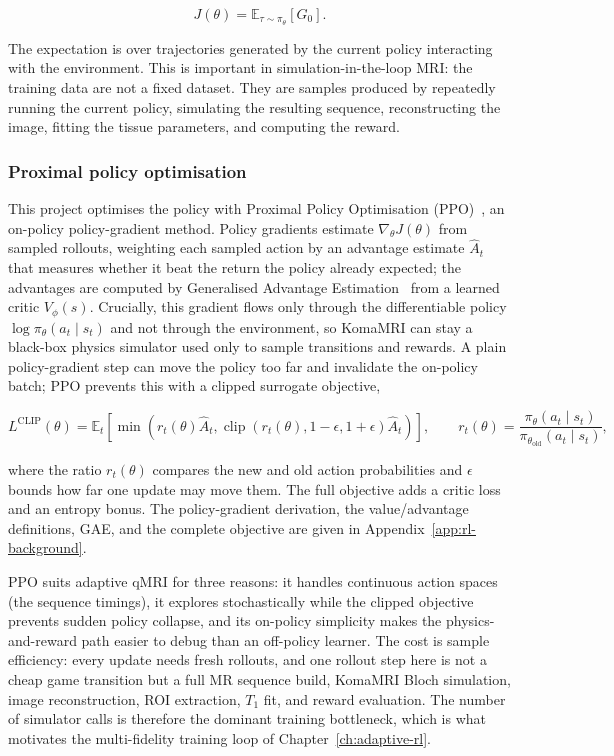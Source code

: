 \begin{equation}
J(\theta) = \mathbb{E}_{\tau \sim \pi_\theta}[G_0].
\end{equation}

The expectation is over trajectories generated by the current policy interacting
with the environment. This is important in simulation-in-the-loop MRI: the
training data are not a fixed dataset. They are samples produced by repeatedly
running the current policy, simulating the resulting sequence, reconstructing
the image, fitting the tissue parameters, and computing the reward.

\subsubsection{Proximal policy optimisation}
This project optimises the policy with Proximal Policy Optimisation
(PPO)~\cite{schulman_ppo_2017}, an on-policy policy-gradient method. Policy
gradients estimate $\nabla_\theta J(\theta)$ from sampled rollouts, weighting
each sampled action by an advantage estimate $\hat{A}_t$ that measures whether
it beat the return the policy already expected; the advantages are computed by
Generalised Advantage Estimation~\cite{schulman_gae_2016} from a learned critic
$V_\phi(s)$. Crucially, this gradient flows only through the differentiable
policy $\log\pi_\theta(a_t\mid s_t)$ and not through the environment, so KomaMRI
can stay a black-box physics simulator used only to sample transitions and
rewards. A plain policy-gradient step can move the policy too far and
invalidate the on-policy batch; PPO prevents this with a clipped surrogate
objective,

\begin{equation}
L^{\mathrm{CLIP}}(\theta)
=
\mathbb{E}_t
\left[
\min
\left(
    r_t(\theta)\hat{A}_t,
    \operatorname{clip}
    \left(r_t(\theta), 1-\epsilon, 1+\epsilon\right)
    \hat{A}_t
\right)
\right],
\qquad
r_t(\theta) =
\frac{\pi_\theta(a_t\mid s_t)}
     {\pi_{\theta_{\mathrm{old}}}(a_t\mid s_t)},
\end{equation}

where the ratio $r_t(\theta)$ compares the new and old action probabilities and
$\epsilon$ bounds how far one update may move them. The full objective adds a
critic loss and an entropy bonus. The policy-gradient derivation, the
value/advantage definitions, GAE, and the complete objective are given in
Appendix~\ref{app:rl-background}.

PPO suits adaptive qMRI for three reasons: it handles continuous action spaces
(the sequence timings), it explores stochastically while the clipped objective
prevents sudden policy collapse, and its on-policy simplicity makes the
physics-and-reward path easier to debug than an off-policy learner. The cost is
sample efficiency: every update needs fresh rollouts, and one rollout step here
is not a cheap game transition but a full MR sequence build, KomaMRI Bloch
simulation, image reconstruction, ROI extraction, $T_1$ fit, and reward
evaluation. The number of simulator calls is therefore the dominant training
bottleneck, which is what motivates the multi-fidelity training loop of
Chapter~\ref{ch:adaptive-rl}.

